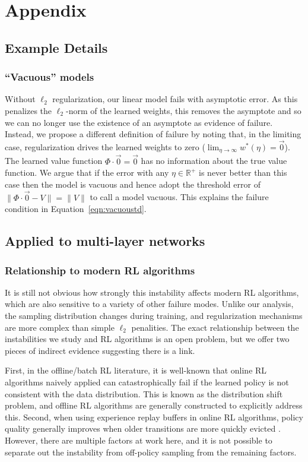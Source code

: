 
\section{Appendix}

\subsection{Example Details}

\subsubsection{``Vacuous'' models}
\label{sec:choiceoffailure}
Without $\ell_2$ regularization, our linear model fails with asymptotic error. As this penalizes the $\ell_2$-norm of the learned weights, this removes the asymptote and so we can no longer use the existence of an asymptote as evidence of failure. Instead, we propose a different definition of failure by noting that, in the limiting case, regularization drives the learned weights to zero ($\lim_{\eta\to\infty} w^*(\eta) = \vec 0$). The learned value function $\Phi\cdot\vec 0 = \vec 0$ has no information about the true value function. We argue that if the error with any $\eta\in\mathbb R^+$ is never better than this case then the model is vacuous and hence adopt the threshold error of $\|\Phi\cdot\vec 0 - V\| = \|V\|$ to call a model vacuous. This explains the failure condition in Equation~\ref{eqn:vacuoustd}.


\subsection{Applied to multi-layer networks}
\label{sec:multilayerapp}


\subsubsection{Relationship to modern RL algorithms}

It is still not obvious how strongly this instability affects modern RL algorithms, which are also sensitive to a variety of other failure modes. Unlike our analysis, the sampling distribution changes during training, and regularization mechanisms are more complex than simple $\ell_2$ penalities. The exact relationship between the instabilities we study and RL algorithms is an open problem, but we offer two pieces of indirect evidence suggesting there is a link.

First, in the offline/batch RL literature, it is well-known that online RL algorithms naively applied can catastrophically fail if the learned policy is not consistent with the data distribution. This is known as the distribution shift problem, \cite[p.~26]{levine2020offline} and offline RL algorithms are generally constructed to explicitly address this. Second, when using experience replay buffers in online RL algorithms, policy quality generally improves when older transitions are more quickly evicted \cite{fedus2020revisiting}. However, there are multiple factors at work here, and it is not possible to separate out the instability from off-policy sampling from the remaining factors.
